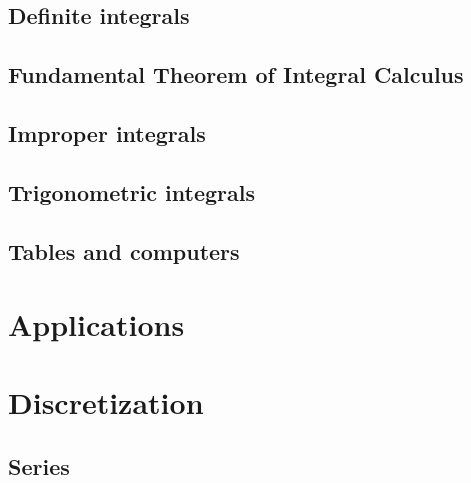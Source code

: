 \documentclass[a4paper]{book}
\begin{document}
\begin{sloppypar}
\section{Definite integrals} \label{ChIntegrationSecDefiniteIntegrals}
\section{Fundamental Theorem of Integral Calculus} \label{ChIntegrationSecFundamentalTheoremOfIntegralCalculus}
\section{Improper integrals} \label{ChIntegrationSecImproperIntegrals}
\section{Trigonometric integrals} \label{ChIntegrationSecTrigonometricIntegrals}
\section{Tables and computers} \label{ChIntegrationSecTablesAndComputers}

\chapter{Applications} \label{ChApplications}

\chapter{Discretization} \label{ChDiscretization}
\section{Series} \label{ChDiscretizationSecSeries}

\end{sloppypar}
\end{document}
